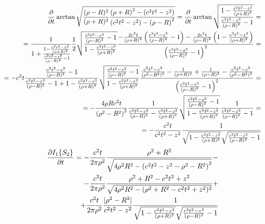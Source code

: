 \textcolor{lightgray}{ \begin{equation*} \begin{aligned}
\frac{\partial }{\partial t} \arctan \sqrt{ \frac{(\rho - R)^2}{(\rho + R)^2}
\frac{\left( \rho + R \right)^2 - \left( c^2t^2 - z^2 \right)} 
{\left( c^2t^2 - z^2 \right) - \left( \rho - R \right)^2} } = 
\frac{\partial }{\partial t} \arctan \sqrt{ \frac
{1 - \frac{c^2t^2 - z^2}{\left( \rho + R \right)^2} } 
{ \frac{c^2t^2 - z^2}{ \left( \rho - R \right)^2 } - 1} } = \\
= \frac{1}{1 + \frac{1 - \frac{c^2t^2 - z^2}{\left( \rho + R \right)^2} } 
{ \frac{c^2t^2 - z^2}{ \left( \rho - R \right)^2 } - 1} } \frac{1}{2}
\sqrt{ \frac{ \frac{c^2t^2 - z^2}{ \left( \rho - R \right)^2 } - 1 }
{1 - \frac{c^2t^2 - z^2}{\left( \rho + R \right)^2} } } 
\frac{ - \frac{2 c^2 t}{\left( \rho + R \right)^2} 
\left( \frac{c^2t^2 - z^2}{ \left( \rho - R \right)^2} - 1 \right) - 
\frac{ 2 c^2 t }{ \left( \rho - R \right)^2 } 
\left( 1 - \frac{c^2t^2 - z^2}{\left( \rho + R \right)^2} \right) }
{\left( \frac{c^2t^2 - z^2}{ \left( \rho - R \right)^2 } - 1 \right)^2} = \\
= - c^2 t \frac{ \frac{c^2t^2-z^2}{(\rho-R)^2} - 1 }
{ \frac{c^2t^2-z^2}{(\rho-R)^2} - 1 + 1 - 
\frac{c^2t^2 - z^2}{\left( \rho + R \right)^2} }
\sqrt{ \frac{ \frac{c^2t^2 - z^2}{ \left( \rho - R \right)^2 } - 1}
{1 - \frac{c^2t^2 - z^2}{\left( \rho + R \right)^2} } } \frac
{ \frac{c^2t^2 - z^2}{ \left( \rho^2 - R^2 \right)^2 } - \frac{1}{(\rho+R)^2} + 
\frac{1}{(\rho-R)^2} - \frac{ c^2t^2 - z^2 }{ \left( \rho^2 - R^2 \right)^2 } }
{ \left( \frac{c^2t^2 - z^2}{ \left( \rho - R \right)^2} - 1 \right)^2 } = \\
= - \frac{4 \rho R c^2 t}{ \left( \rho^2 - R^2 \right)^2 } 
\frac{ 1 }{ \frac{c^2t^2-z^2}{(\rho-R)^2} - 
\frac{c^2t^2 - z^2}{\left( \rho + R \right)^2} }
\sqrt{ \frac{ \frac{c^2t^2 - z^2}{ \left( \rho - R \right)^2 } - 1}
{1 - \frac{c^2t^2 - z^2}{\left( \rho + R \right)^2} } } \frac
{ 1 }{ \frac{c^2t^2 - z^2}{ \left( \rho - R \right)^2} - 1 } = \\
= - \frac{c^2 t}{ c^2 t^2 - z^2 } \frac{1} { 
\sqrt{ 1 - \frac{c^2t^2 - z^2}{(\rho + R)^2 } } 
\sqrt{ \frac{c^2t^2 - z^2}{ (\rho - R)^2 } - 1} }
\end{aligned} \end{equation*} }
%
\textcolor{lightgray}{ \begin{equation*} \begin{aligned}
\frac{\partial  I_1 \{ S_2 \} }{\partial t} = - \frac{c^2 t}{2 \pi \rho^2}
\frac{\rho^2 + R^2}
{ \sqrt{4 \rho^2 R^2 - \left(c^2 t^2 - z^2 - \rho^2 - R^2 \right)^2} } - \\
- \frac{c^2 t}{2 \pi \rho^2} \frac{\rho^2 + R^2 - c^2 t^2 + z^2}
{ \sqrt{4 \rho^2 R^2 - (\rho^2 + R^2 - c^2t^2 + z^2)^2} } + \\ 
+ \frac{ c^2 t }{2 \pi \rho^2} \frac{|\rho^2 - R^2|}{ c^2 t^2 - z^2 } \frac{1} 
{ \sqrt{ 1 - \frac{c^2t^2 - z^2}{(\rho + R)^2 } } 
\sqrt{ \frac{c^2t^2 - z^2}{ (\rho - R)^2 } - 1} }
\end{aligned} \end{equation*} }
